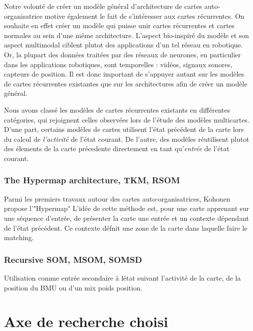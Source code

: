 \documentclass[../main]{subfiles}
\begin{document}
Notre volonté de créer un modèle général d'architecture de cartes auto-organisatrice motive également le fait de s'intéresser aux cartes récurrentes. On souhaite en effet créer un modèle qui puisse unir cartes récurrentes et cartes normales au sein d'une même architecture. L'aspect bio-inspiré du modèle et son aspect multimodal ciblent plutot des applications d'un tel réseau en robotique. Or, la plupart des données traitées par des réseaux de neurones, en particulier dans les applications robotiques, sont temporelles : vidéos, signaux sonores, capteurs de position. Il est donc important de s'appuyer autant sur les modèles de cartes récurrentes existantes que sur les architectures afin de créer un modèle général.


Nous avons classé les modèles de cartes récurrentes existants en différentes catégories, qui rejoignent celles observées lors de l'étude des modèles multicartes.
D'une part, certains modèles de cartes utilisent l'état précédent de la carte lors du calcul de \emph{l'activité} de l'état courant. De l'autre, des modèles réutilisent plutot des élements de la carte précedente directement en tant qu'\emph{entrée} de l'état courant.

\subsubsection{The Hypermap architecture, TKM, RSOM}
Parmi les premiers travaux autour des cartes auto-organisatrices, Kohonen propose l'"Hypermap" \cite{Kohonen1991THEHA} L'idée de cette méthode est, pour une carte apprenant sur une séquence d'entrée, de présenter la carte une entrée et un contexte dépendant de l'état précédent. Ce contexte défnit une zone de la carte dans laquelle faire le matching.
\cite{varsta_temporal_2001}
\subsubsection{Recursive SOM, MSOM, SOMSD}
\cite{Voegtlin2002RecursiveSM,hammer_recursive_2004,hammer_self-organizing_2005,hagenbuchner_self-organizing_2003,fix20}
Utilisation comme entrée secondaire à létat suivant l'activité de la carte, de la position du BMU ou d'un mix poids position. 


\section{Axe de recherche choisi}
\end{document}
